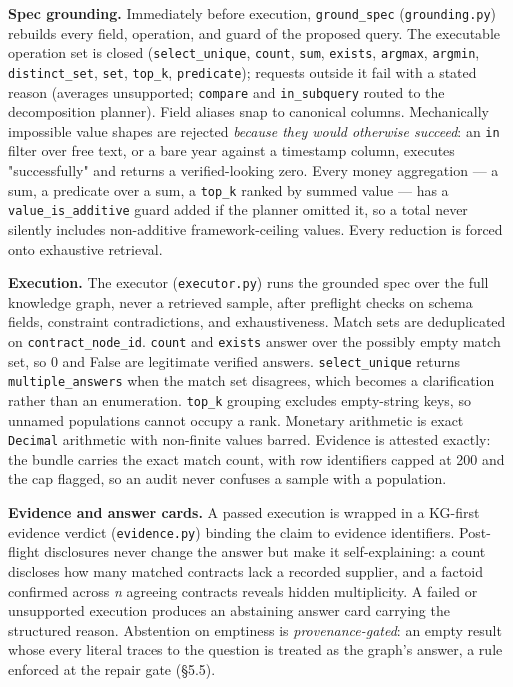 \documentclass[10pt]{article} %
\begin{document}
\textbf{Spec grounding.} Immediately before execution, \texttt{ground\_spec} (\texttt{grounding.py}) rebuilds every field, operation, and guard of the proposed query. The executable operation set is closed (\texttt{select\_unique}, \texttt{count}, \texttt{sum}, \texttt{exists}, \texttt{argmax}, \texttt{argmin}, \texttt{distinct\_set}, \texttt{set}, \texttt{top\_k}, \texttt{predicate}); requests outside it fail with a stated reason (averages unsupported; \texttt{compare} and \texttt{in\_subquery} routed to the decomposition planner). Field aliases snap to canonical columns. Mechanically impossible value shapes are rejected \emph{because they would otherwise succeed}: an \texttt{in} filter over free text, or a bare year against a timestamp column, executes "successfully" and returns a verified-looking zero. Every money aggregation --- a sum, a predicate over a sum, a \texttt{top\_k} ranked by summed value --- has a \texttt{value\_is\_additive} guard added if the planner omitted it, so a total never silently includes non-additive framework-ceiling values. Every reduction is forced onto exhaustive retrieval.

\textbf{Execution.} The executor (\texttt{executor.py}) runs the grounded spec over the full knowledge graph, never a retrieved sample, after preflight checks on schema fields, constraint contradictions, and exhaustiveness. Match sets are deduplicated on \texttt{contract\_node\_id}. \texttt{count} and \texttt{exists} answer over the possibly empty match set, so 0 and False are legitimate verified answers. \texttt{select\_unique} returns \texttt{multiple\_answers} when the match set disagrees, which becomes a clarification rather than an enumeration. \texttt{top\_k} grouping excludes empty-string keys, so unnamed populations cannot occupy a rank. Monetary arithmetic is exact \texttt{Decimal} arithmetic with non-finite values barred. Evidence is attested exactly: the bundle carries the exact match count, with row identifiers capped at 200 and the cap flagged, so an audit never confuses a sample with a population.

\textbf{Evidence and answer cards.} A passed execution is wrapped in a KG-first evidence verdict (\texttt{evidence.py}) binding the claim to evidence identifiers. Post-flight disclosures never change the answer but make it self-explaining: a count discloses how many matched contracts lack a recorded supplier, and a factoid confirmed across \emph{n} agreeing contracts reveals hidden multiplicity. A failed or unsupported execution produces an abstaining answer card carrying the structured reason. Abstention on emptiness is \emph{provenance-gated}: an empty result whose every literal traces to the question is treated as the graph's answer, a rule enforced at the repair gate (\S5.5).
\end{document}
